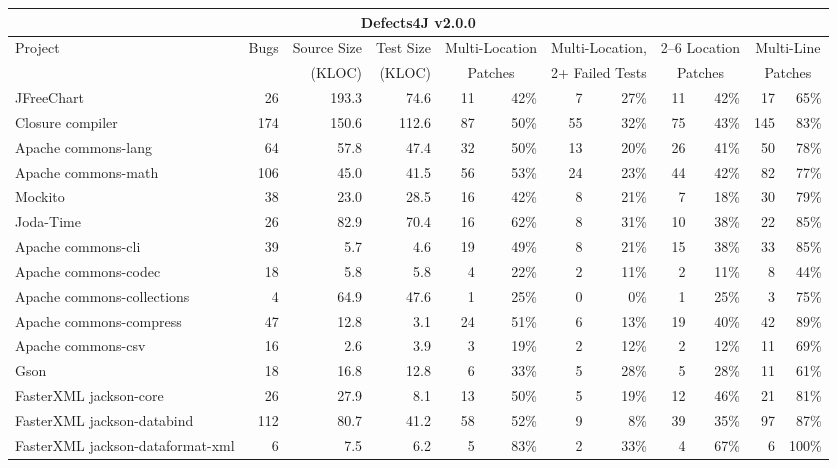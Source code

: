 \documentclass[10pt, conference]{IEEEtran}
\begin{document}
\begin{table}
\begin{center}
\begin{tabular}{l  rrr | rr rr rr rr }
\toprule
\multicolumn{12}{c}{\textbf{Defects4J v2.0.0}} \\
\midrule
\multirow{2}{*}{Project} & \multirow{2}{*}{Bugs} & Source Size & Test Size & \multicolumn{2}{c}{Multi-Location} & \multicolumn{2}{c}{Multi-Location,}      & \multicolumn{2}{c}{2--6 Location} & \multicolumn{2}{c}{Multi-Line} \\
            &          &  (KLOC) & (KLOC)&
\multicolumn{2}{c}{Patches}              & \multicolumn{2}{c}{2+ Failed Tests}   & \multicolumn{2}{c}{Patches}             & \multicolumn{2}{c}{Patches} \\
\midrule
JFreeChart  & 26 & 193.3 & 74.6  & 11 & 42\% & 7 & 27\% & 11 & 42\% & 17 & 65\%\\
Closure compiler & 174 & 150.6 & 112.6 & 87 & 50\% & 55 & 32\% & 75 & 43\% & 145 & 83\% \\
Apache commons-lang & 64 & 57.8 & 47.4  & 32 & 50\% & 13 & 20\% & 26 & 41\% & 50 & 78\% \\
Apache commons-math & 106 & 45.0 & 41.5 & 56 & 53\% & 24 & 23\% & 44 & 42\% & 82 & 77\% \\
Mockito & 38 & 23.0 & 28.5 & 16 & 42\% & 8 & 21\% & 7 & 18\% & 30 & 79\% \\
Joda-Time & 26 & 82.9 & 70.4 & 16 & 62\% & 8 & 31\% & 10 & 38\% & 22 & 85\% \\
Apache commons-cli & 39 & 5.7 & 4.6 & 19 & 49\% & 8 & 21\% & 15 & 38\% & 33 & 85\% \\
Apache commons-codec & 18 & 5.8 & 5.8 & 4 & 22\% & 2 & 11\% & 2 & 11\% & 8 & 44\% \\
Apache commons-collections & 4 & 64.9 & 47.6 & 1 & 25\% & 0 & 0\% & 1 & 25\% & 3 & 75\% \\
Apache commons-compress & 47 & 12.8 & 3.1 & 24 & 51\% & 6 & 13\% & 19 & 40\% & 42 & 89\% \\ 
Apache commons-csv & 16 & 2.6 & 3.9 & 3 & 19\% & 2 & 12\% & 2 & 12\% & 11 & 69\% \\
Gson & 18 & 16.8 & 12.8 & 6 & 33\% & 5 & 28\% & 5 & 28\% & 11 & 61\% \\
FasterXML jackson-core & 26 & 27.9 & 8.1 & 13 & 50\% & 5 & 19\% & 12 & 46\% & 21 & 81\% \\
FasterXML jackson-databind & 112 & 80.7 & 41.2 & 58 & 52\% & 9 & 8\% & 39 & 35\% & 97 & 87\% \\
FasterXML jackson-dataformat-xml & 6 & 7.5 & 6.2 & 5 & 83\% & 2 & 33\% & 4 & 67\% & 6 & 100\% \\

\end{tabular}
\end{center}
\end{table}
\end{document}
